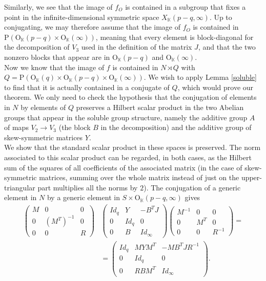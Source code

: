 \documentclass{article}
\theoremstyle{definition}
\theoremstyle{remark}
\theoremstyle{plain}
\begin{document}
Similarly, we see that the image of $f_O$ is contained in a subgroup that fixes a point in the infinite-dimensional symmetric space $X_\mathbb{K}(p-q,\infty)$. Up to conjugating, we may therefore assume that the image of $f_O$ is contained in $\mathrm{P}(\mathrm{O}_\mathbb{K}(p-q)\times \mathrm{O}_\mathbb{K}(\infty))$, meaning that every element is block-diagonal for the decomposition of $V_3$ used in the definition of the matrix $J$, and that the two nonzero blocks that appear are in $\mathrm{O}_\mathbb{K}(p-q)$ and $\mathrm{O}_\mathbb{K}(\infty)$. \\

Now we know that the image of $f$ is contained in $N\rtimes Q$ with $Q=\mathrm{P}(\mathrm{O}_\mathbb{K}(q)\times\mathrm{O}_\mathbb{K}(p-q)\times\mathrm{O}_\mathbb{K}(\infty))$. We wish to apply Lemma \ref{soluble} to find that it is actually contained in a conjugate of $Q$, which would prove our theorem. We only need to check the hypothesis that the conjugation of elements in $N$ by elements of $Q$ preserves a Hilbert scalar product in the two Abelian groups that appear in the soluble group structure, namely the additive group $A$ of maps $V_2\rightarrow V_3$ (the block $B$ in the decomposition) and the additive group of skew-symmetric matrices $Y$. \\

We show that the standard scalar product in these spaces is preserved. The norm associated to this scalar product can be regarded, in both cases, as the Hilbert sum of the squares of all coefficients of the associated matrix (in the case of skew-symmetric matrices, summing over the whole matrix instead of just on the upper-triangular part multiplies all the norms by $2$). The conjugation of a generic element in $N$ by a generic element in $S\times \mathrm{O}_\mathbb{K}(p-q,\infty)$ gives
\begin{align*}
\left(\begin{array}{c|c|c}
    M & 0 & 0 \\
    \hline
    0 & (M^T)^{-1} & 0 \\
    \hline
    0 & 0 & R
\end{array}\right)&\left(\begin{array}{c|c|c}
    Id_q & Y & -B^T J \\
    \hline
    0 & Id_q & 0 \\
    \hline
    0 & B & Id_\infty
\end{array}\right)\left(\begin{array}{c|c|c}
    M^{-1} & 0 & 0 \\
    \hline
    0 & M^T & 0 \\
    \hline
    0 & 0 & R^{-1}
\end{array}\right)= \\
&=\left(\begin{array}{c|c|c}
    Id_q & M Y M^T & -M B^T J R^{-1} \\
    \hline
    0 & Id_q & 0 \\
    \hline
    0 & R B M^T & Id_\infty
\end{array}\right).
\end{align*}
\end{document}
